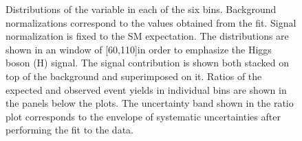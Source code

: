 \begin{figure}[htbp]
{}
\caption{Distributions of the \mll variable in each of the six \pth bins. Background normalizations correspond to the values obtained from the fit. Signal normalization is fixed to the SM expectation. The distributions are shown in an \mt window of [60,110]\GeV in order to emphasize the Higgs boson (H) signal. The signal contribution is shown both stacked on top of the background and superimposed on it. Ratios of the expected and observed event yields in individual bins are shown in the panels below the plots. The uncertainty band shown in the ratio plot corresponds to the envelope of systematic uncertainties after performing the fit to the data.}\label{fig:mllSignalRegion}
\end{figure}

